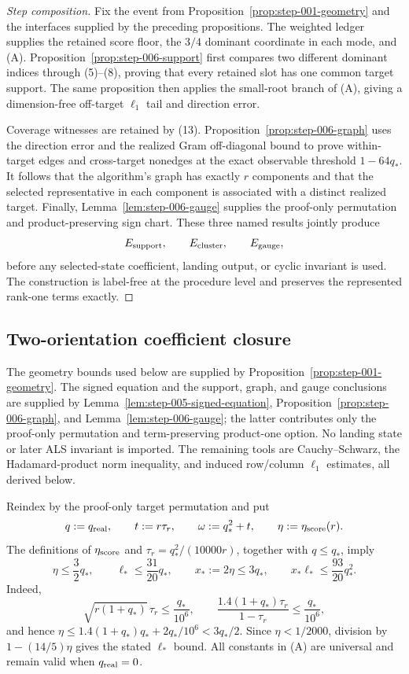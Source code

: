 \begin{proof}[Step composition]
Fix the event from Proposition~\ref{prop:step-001-geometry} and the
interfaces supplied by the preceding propositions. The weighted ledger
supplies the retained score floor, the \(3/4\) dominant coordinate in each
mode, and (A). Proposition~\ref{prop:step-006-support} first compares two
different dominant indices through (5)--(8), proving that every retained
slot has one common target support. The same proposition then applies the
small-root branch of (A), giving a dimension-free off-target \(\ell_1\) tail
and direction error.

Coverage witnesses are retained by (13). Proposition~\ref{prop:step-006-graph}
uses the direction error and the realized Gram off-diagonal bound to prove
within-target edges and cross-target nonedges at the exact observable
threshold \(1-64q_*\). It follows that the algorithm's graph has exactly
\(r\) components and that the selected representative in each component is
associated with a distinct realized target. Finally,
Lemma~\ref{lem:step-006-gauge} supplies the proof-only permutation and
product-preserving sign chart. These three named results jointly produce
\[
 E_{\rm support},\qquad E_{\rm cluster},\qquad E_{\rm gauge},
\]
before any selected-state coefficient, landing output, or cyclic invariant is
used. The construction is label-free at the procedure level and preserves
the represented rank-one terms exactly.
\end{proof}

\subsection{Two-orientation coefficient closure}\label{app:step-007}

The geometry bounds used below are supplied by
Proposition~\ref{prop:step-001-geometry}. The signed equation and the support,
graph, and gauge conclusions are supplied by
Lemma~\ref{lem:step-005-signed-equation}, Proposition~\ref{prop:step-006-graph},
and Lemma~\ref{lem:step-006-gauge}; the latter contributes only the
proof-only permutation and term-preserving product-one option. No landing
state or later ALS invariant is imported. The remaining tools are
Cauchy--Schwarz, the Hadamard-product norm inequality, and induced row/column
$\ell_1$ estimates, all derived below.

Reindex by the proof-only target permutation and put
\[
q:=q_{\rm real},\qquad t:=r\tau_r,\qquad
\omega:=q_*^2+t,\qquad \eta:=\eta_{\rm score}(r).
\]
The definitions of $\eta_{\rm score}$ and
$\tau_r=q_*^2/(10000r)$, together with $q\le q_*$, imply
\[
\eta\le\frac32q_*,\qquad \ell_*\le\frac{31}{20}q_*,\qquad
x_*:=2\eta\le3q_*,\qquad x_*\ell_*\le\frac{93}{20}q_*^2.
\tag{A}
\]
Indeed,
\[
\sqrt{r(1+q_*)}\,\tau_r\le\frac{q_*}{10^6},\qquad
\frac{1.4(1+q_*)\tau_r}{1-\tau_r}\le\frac{q_*}{10^6},
\]
and hence
$\eta\le1.4(1+q_*)q_*+2q_*/10^6<3q_*/2$. Since
$\eta<1/2000$, division by $1-(14/5)\eta$ gives the stated $\ell_*$ bound.
All constants in (A) are universal and remain valid when $q_{\rm real}=0$.


